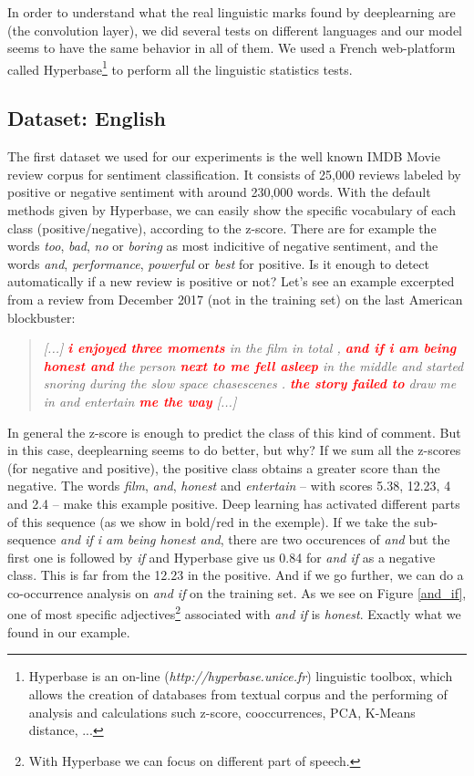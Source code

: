 In order to understand what the real linguistic marks found by deeplearning are (the convolution layer), we did several tests on different languages and our model seems to have the same behavior in all of them. We used a French web-platform called Hyperbase\footnote{Hyperbase is an on-line (\textit{http://hyperbase.unice.fr}) linguistic toolbox, which allows the creation of databases from textual corpus and the performing of analysis and calculations such z-score, cooccurrences, PCA, K-Means distance, ... } to perform all the linguistic statistics tests. 

\subsection{Dataset: English}
\label{subsec:dataset:en}

The first dataset we used for our experiments is the well known IMDB Movie review corpus for sentiment classification. It consists of 25,000 reviews labeled by positive or negative sentiment with around 230,000 words. With the default methods given by Hyperbase, we can easily show the specific vocabulary of each class (positive/negative), according to the z-score. There are for example the words \textit{too}, \textit{bad}, \textit{no} or \textit{boring} as most indicitive of negative sentiment, and the words \textit{and}, \textit{performance}, \textit{powerful} or \textit{best} for positive. 
Is it enough to detect automatically if a new review is positive or not? Let's see an example excerpted from a review from December 2017 (not in the training set) on the last American blockbuster:

\begin{quote}
\textit{[...] \textcolor{red}{\textbf{i enjoyed three moments}} in the film in total , \textcolor{red}{\textbf{and if i am being honest and}} the person \textcolor{red}{\textbf{next to me fell asleep}} in the middle and started snoring during the slow space chasescenes . \textcolor{red}{\textbf{the story failed to}} draw me in and entertain \textcolor{red}{\textbf{me the way}} [...]} 
\end{quote}%

In general the z-score is enough to predict the class of this kind of comment. But in this case, deeplearning seems to do better, but why? If we sum all the z-scores (for negative and positive), the positive class obtains a greater score than the negative. The words \textit{film}, \textit{and}, \textit{honest} and \textit{entertain} -- with scores 5.38, 12.23, 4 and 2.4 -- make this example positive. Deep learning has activated different parts of this sequence (as we show in bold/red in the exemple). If we take the sub-sequence \textit{and if i am being honest and}, there are two occurences of \textit{and} but the first one is followed by \textit{if} and Hyperbase give us 0.84 for \textit{and if} as a negative class. This is far from the 12.23 in the positive. And if we go further, we can do a co-occurrence analysis on \textit{and if} on the training set. As we see on Figure \ref{and_if}, one of most specific adjectives\footnote{With Hyperbase we can focus on different part of speech.} associated with \textit{and if} is \textit{honest}. Exactly what we found in our example. 

